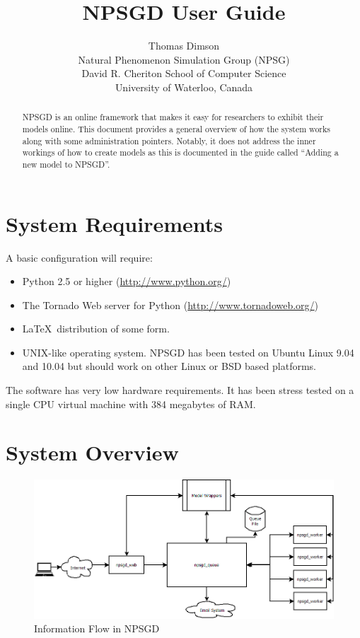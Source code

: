 \documentclass{article}
\title{NPSGD User Guide}
\author{Thomas Dimson\\Natural Phenomenon Simulation Group (NPSG)\\David R. Cheriton School of Computer Science\\University of Waterloo, Canada}
\begin{document}
\maketitle
\begin{abstract}
    NPSGD is an online framework that makes it easy for researchers to exhibit
    their models online. This document provides a general overview of how the
    system works along with some administration pointers. Notably, it does
    not address the inner workings of how to create models as this is
    documented in the guide called ``Adding a new model to NPSGD''.
\end{abstract}
\tableofcontents

\section{System Requirements}
\label{sec:requirements}
A basic configuration will require:
\begin{itemize}
    \item Python 2.5 or higher (\url{http://www.python.org/})
    \item The Tornado Web server for Python (\url{http://www.tornadoweb.org/})
    \item \LaTeX\ distribution of some form.
    \item UNIX-like operating system. NPSGD has been tested on Ubuntu Linux 9.04
    and 10.04 but should work on other Linux or BSD based platforms.
\end{itemize}

The software has very low hardware requirements. It has been stress tested on 
a single CPU virtual machine with 384 megabytes of RAM. 

\section{System Overview}

\begin{figure}[ht]
    \centering
    \includegraphics[width=6in]{npsgd_layout.png}
    \caption{Information Flow in NPSGD}
    \label{fig:layout}
\end{figure}
\end{document}

